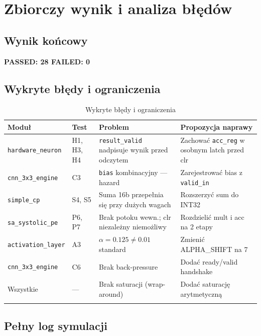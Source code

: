 \documentclass[12pt,a4paper]{article}
\begin{document}
\section{Zbiorczy wynik i analiza błędów}

\subsection{Wynik końcowy}

\begin{center}
\Large\textbf{PASSED: 28 \quad FAILED: 0}
\end{center}

\subsection{Wykryte błędy i ograniczenia}

\begin{longtable}{p{2.8cm}lp{4.5cm}p{4cm}}
\toprule
\textbf{Moduł} & \textbf{Test} & \textbf{Problem} & \textbf{Propozycja naprawy} \\
\midrule
\texttt{hardware\_neuron} & H1, H3, H4 & \texttt{result\_valid} nadpisuje wynik przed odczytem & Zachować \texttt{acc\_reg} w osobnym latch przed clr \\
\texttt{cnn\_3x3\_engine} & C3 & \texttt{bias} kombinacyjny — hazard & Zarejestrować bias z \texttt{valid\_in} \\
\texttt{simple\_cp} & S4, S5 & Suma 16b przepełnia się przy dużych wagach & Rozszerzyć sum do INT32 \\
\texttt{sa\_systolic\_pe} & P6, P7 & Brak potoku wewn.; clr niezależny niemożliwy & Rozdzielić mult i acc na 2 etapy \\
\texttt{activation\_layer} & A3 & $\alpha = 0.125 \neq 0.01$ standard & Zmienić ALPHA\_SHIFT na 7 \\
\texttt{cnn\_3x3\_engine} & C6 & Brak back-pressure & Dodać ready/valid handshake \\
Wszystkie & --- & Brak saturacji (wrap-around) & Dodać saturację arytmetyczną \\
\bottomrule
\caption{Wykryte błędy i ograniczenia}
\end{longtable}

\subsection{Pełny log symulacji}
\end{document}
